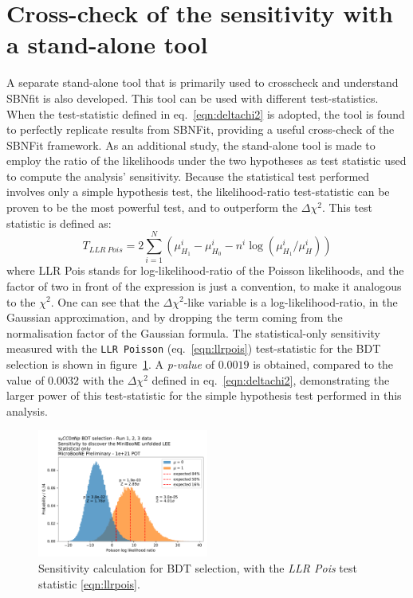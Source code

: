 \section{Cross-check of the sensitivity with a stand-alone tool}

A separate stand-alone tool that is primarily used to crosscheck and understand SBNfit is also developed. This tool can be used with different test-statistics. When the test-statistic defined in eq.~\ref{eqn:deltachi2} is adopted, the tool is found to perfectly replicate results from SBNFit, providing a useful cross-check of the SBNFit framework. As an additional study, the stand-alone tool is made to employ the ratio of the likelihoods under the two hypotheses as test statistic used to compute the analysis' sensitivity.
Because the statistical test performed involves only a simple hypothesis test, the likelihood-ratio test-statistic can be proven to be the most powerful test, and to outperform the $\Delta\chi^2$.
This test statistic is defined as:
\begin{equation}
\label{eqn:llrpois}
T_{LLR~Pois} = 2 \sum_{i=1}^{N}\left( \mu^i_{H_1} - \mu^i_{H_0} - n^i\log\left(\mu^i_{H_1} / \mu^i_{H}\right) \right)
\end{equation}
where LLR Pois stands for log-likelihood-ratio of the Poisson likelihoods, and the factor of two in front of the expression is just a convention, to make it analogous to the $\chi^2$.
One can see that the $\Delta \chi^2$-like variable is a log-likelihood-ratio, in the Gaussian approximation, and by dropping the term coming from the normalisation factor of the Gaussian formula.
The statistical-only sensitivity measured with the \texttt{LLR Poisson} (eq.~\ref{eqn:llrpois}) test-statistic for the BDT \npsel selection is shown in figure~\ref{fig:1eNp:bdt:sensitivityLLR}. A \textit{p-value} of $0.0019$ is obtained, compared to the value of $0.0032$ with the $\Delta\chi^2$ defined in eq.~\ref{eqn:deltachi2}, demonstrating the larger power of this test-statistic for the simple hypothesis test performed in this analysis.


\begin{figure}[H]
    \centering
    \includegraphics[width=0.5\textwidth]{Sensitivity/pois_llr_test_stat.pdf}
    \caption{Sensitivity calculation for BDT \npsel selection, with the \emph{LLR Pois} test statistic \ref{eqn:llrpois}.}
    \label{fig:1eNp:bdt:sensitivityLLR}
\end{figure}


